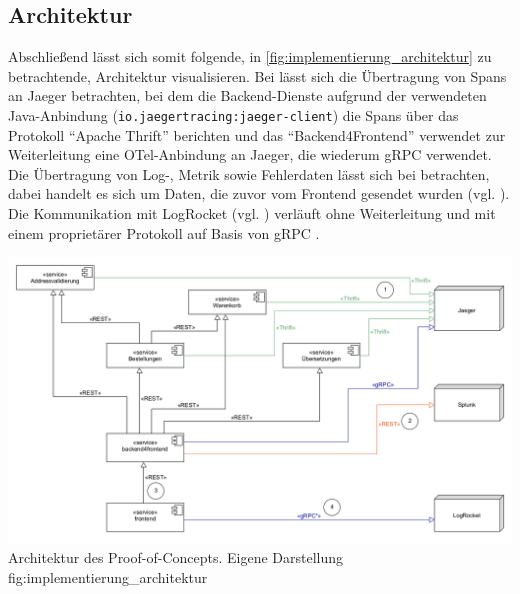 \subsection{Architektur}

Abschließend lässt sich somit folgende, in \autoref{fig:implementierung_architektur} zu betrachtende, Architektur visualisieren. Bei  lässt sich die Übertragung von Spans an Jaeger betrachten, bei dem die Backend-Dienste aufgrund der verwendeten Java-Anbindung (\texttt{io\allowbreak{}.\allowbreak{}jaegertracing\allowbreak{}:\allowbreak{}jaeger-client}) die Spans über das Protokoll \enquote{Apache Thrift} \cite{Thrift} berichten und das \enquote{Backend4Frontend} verwendet zur Weiterleitung eine OTel-Anbindung an Jaeger, die wiederum gRPC verwendet. Die Übertragung von Log-, Metrik sowie Fehlerdaten lässt sich bei  betrachten, dabei handelt es sich um Daten, die zuvor vom Frontend gesendet wurden (vgl. ). Die Kommunikation mit LogRocket (vgl. ) verläuft ohne Weiterleitung und mit einem proprietärer Protokoll auf Basis von gRPC \cite{LogRocketPerformance}.

{
	\centering
	\includegraphics[height=0.90\linewidth]{img/04_erstellung-poc/implementierung.png}
}
{Architektur des Proof-of-Concepts. Eigene Darstellung}
{fig:implementierung_architektur}